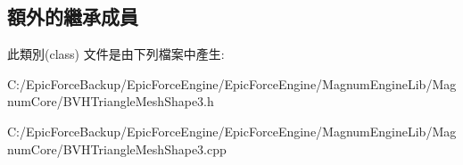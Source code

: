 \subsection*{額外的繼承成員}


此類別(class) 文件是由下列檔案中產生\+:\begin{DoxyCompactItemize}
\item 
C\+:/\+Epic\+Force\+Backup/\+Epic\+Force\+Engine/\+Epic\+Force\+Engine/\+Magnum\+Engine\+Lib/\+Magnum\+Core/B\+V\+H\+Triangle\+Mesh\+Shape3.\+h\item 
C\+:/\+Epic\+Force\+Backup/\+Epic\+Force\+Engine/\+Epic\+Force\+Engine/\+Magnum\+Engine\+Lib/\+Magnum\+Core/B\+V\+H\+Triangle\+Mesh\+Shape3.\+cpp\end{DoxyCompactItemize}
